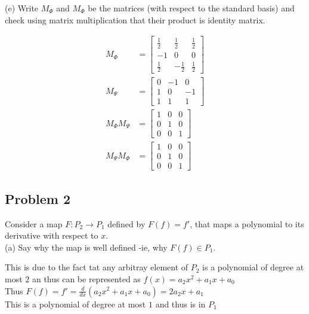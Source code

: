 \documentclass[answers,12pt,addpoints]{exam}
\begin{document}
(e) Write $M_\Phi$ and $M_\Phi$ be the matrices (with respect to the standard basis) and check using matrix multiplication that their product is identity matrix.
\begin{solution}
    \begin{align*}
        M_\Phi &= \begin{bmatrix} 
            \frac{1}{2} & \frac{1}{2} & \frac{1}{2} \\
            -1 & 0 & 0\\
            \frac{1}{2} & -\frac{1}{2} & \frac{1}{2}
        \end{bmatrix} \\
        M_\Psi &= \begin{bmatrix} 
            0 & -1 & 0 \\
            1 & 0 & -1\\
            1 & 1 & 1
        \end{bmatrix} \\
        M_\Phi M_\Psi &= \begin{bmatrix} 
            1 & 0 & 0 \\
            0 & 1 & 0\\
            0 & 0 & 1
        \end{bmatrix} \\
        M_\Psi M_\Phi &= \begin{bmatrix} 
            1 & 0 & 0 \\
            0 & 1 & 0\\
            0 & 0 & 1
        \end{bmatrix}
    \end{align*}
\end{solution}

\subsection*{Problem 2}
Consider a map $F:P_2\to P_1$ defined by $F(f)=f'$, that maps a polynomial to its derivative with respect to $x$.\\

(a) Say why the map is well defined -ie, why $F(f)\in P_1$.
\begin{solution}
    This is due to the fact tat any arbitray element of $P_2$ is a polynomial of degree at most $2$ an thus can be represented as $f(x)=a_2x^2+a_1x+a_0$\\
    Thus $F(f)=f'=\frac{d}{dx}(a_2x^2+a_1x+a_0)=2a_2x+a_1$\\
    This is a polynomial of degree at most $1$ and thus is in $P_1$\\
\end{solution}
\end{document}
